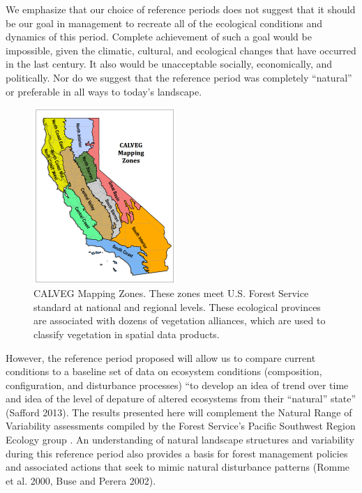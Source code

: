 We emphasize that our choice of reference periods does not suggest that it should be our goal in management to recreate all of the ecological conditions and dynamics of this period. Complete achievement of such a goal would be impossible, given the climatic, cultural, and ecological changes that have occurred in the last century. It also would be unacceptable socially, economically, and politically. Nor do we suggest that the reference period was completely ``natural'' or preferable in all ways to today’s landscape. 

\begin{figure}
\includegraphics[width=0.48\textwidth]{images/CALVEGmappingzones.png}
\caption{\small CALVEG Mapping Zones. These zones meet U.S. Forest Service standard at national and regional levels. These ecological provinces are associated with dozens of vegetation alliances, which are used to classify vegetation in spatial data products.} 
\label{calveg}
\end{figure}

However, the reference period proposed will allow us to compare current conditions to a baseline set of data on ecosystem conditions (composition, configuration, and disturbance processes) ``to develop an idea of trend over time and idea of the level of depature of altered ecosystems from their ``natural'' state'' (Safford 2013). The results presented here will complement the Natural Range of Variability assessments compiled by the Forest Service's Pacific Southwest Region Ecology group . An understanding of natural landscape structures and variability during this reference period also provides a basis for forest management policies and associated actions that seek to mimic natural disturbance patterns  (Romme et al. 2000, Buse and Perera 2002).

